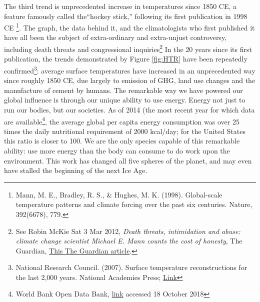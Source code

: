 \documentclass[amstex,12pt]{book}
\begin{document}
The third trend is unprecedented increase in temperatures since 1850 CE, a feature famously called the``hockey stick,'' following its first publication in 1998 CE \footnote{Mann, M. E., Bradley, R. S., \& Hughes, M. K. (1998). Global-scale temperature patterns and climate forcing over the past six centuries. Nature, 392(6678), 779.}. The graph, the data behind it, and the climatologists who first published it have all been the subject of extra-ordinary and extra-unjust controversy, including death threats and congressional inquiries\footnote{See Robin McKie Sat 3 Mar 2012, \textit{Death threats, intimidation and abuse: climate change scientist Michael E. Mann counts the cost of honesty}, The Guardian, \href{https://www.theguardian.com/science/2012/mar/03/michael-mann-climate-change-deniers}{This The Guardian article}.} In the 20 years since its first publication, the trends demonstrated by Figure \ref{fig:HTR} have been repeatedly confirmed\footnote{National Research Council. (2007). Surface temperature reconstructions for the last 2,000 years. National Academies Press; \href{https://www.nap.edu/read/11676/chapter/1}{Link}}: average surface temperatures have increased in an unprecedented way since roughly 1850 CE, due largely to emission of GHG, land use changes and the manufacture of cement by humans. The remarkable way we have powered our global influence is through our unique ability to use energy. Energy not just to run our bodies, but our societies. As of 2014 (the most recent year for which data are available\footnote{World Bank Open Data Bank, \href{https://data.worldbank.org/indicator/EG.USE.PCAP.KG.OE}{link} accessed 18 October 2018}, the average global per capita energy consumption was over 25 times the daily nutritional requirement of 2000 kcal/day; for the United States this ratio is closer to 100. We are the only species capable of this remarkable ability: use more energy than the body can consume to do work upon the environment. This work has changed all five spheres of the planet, and may even have stalled the beginning of the next Ice Age.   \\
\end{document}
